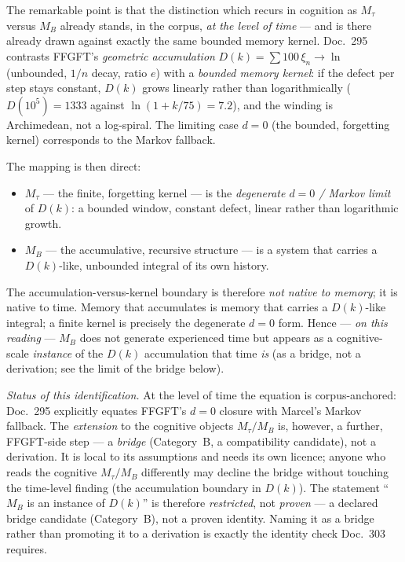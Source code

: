 The remarkable point is that the distinction which recurs in cognition as $M_\tau$ versus
$M_B$ already stands, in the corpus, \emph{at the level of time} --- and is there already
drawn against exactly the same bounded memory kernel. Doc.~295 contrasts FFGFT's
\emph{geometric accumulation} $D(k)=\sum 100\,\xi_n\to\ln$ (unbounded, $1/n$ decay, ratio
$e$) with a \emph{bounded memory kernel}: if the defect per step stays constant, $D(k)$
grows linearly rather than logarithmically ($D(10^5)=1333$ against $\ln(1+k/75)=7.2$), and
the winding is Archimedean, not a log-spiral. The limiting case $d=0$ (the bounded,
forgetting kernel) corresponds to the Markov fallback.

The mapping is then direct:
\begin{itemize}
\item $M_\tau$ --- the finite, forgetting kernel --- is the \emph{degenerate $d=0$ / Markov
limit} of $D(k)$: a bounded window, constant defect, linear rather than logarithmic growth.
\item $M_B$ --- the accumulative, recursive structure --- is a system that carries a
$D(k)$-like, unbounded integral of its own history.
\end{itemize}

The accumulation-versus-kernel boundary is therefore \emph{not native to memory}; it is
native to time. Memory that accumulates is memory that carries a $D(k)$-like integral; a
finite kernel is precisely the degenerate $d=0$ form. Hence --- \emph{on this reading} --- $M_B$ does not generate
experienced time but appears as a cognitive-scale \emph{instance} of the $D(k)$ accumulation
that time \emph{is} (as a bridge, not a derivation; see the limit of the bridge below).

\emph{Status of this identification.} At the level of time the equation is corpus-anchored:
Doc.~295 explicitly equates FFGFT's $d=0$ closure with Marcel's Markov fallback. The
\emph{extension} to the cognitive objects $M_\tau/M_B$ is, however, a further, FFGFT-side
step --- a \emph{bridge} (Category~B, a compatibility candidate), not a derivation. It is
local to its assumptions and needs its own licence; anyone who reads the cognitive
$M_\tau/M_B$ differently may decline the bridge without touching the time-level finding (the
accumulation boundary in $D(k)$). The statement \enquote{$M_B$ is an instance of $D(k)$} is
therefore \emph{restricted}, not \emph{proven} --- a declared bridge candidate (Category~B), not a proven identity.
Naming it as a bridge rather than promoting it to a derivation is exactly the identity check
Doc.~303 requires.

